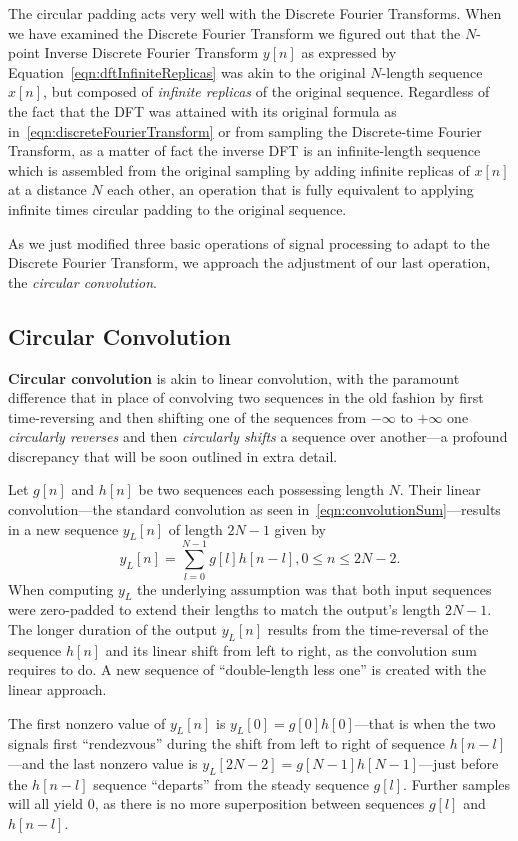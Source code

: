 \documentclass[\documentfontsize, twocolumn]{\classname}
\begin{document}
The circular padding acts very well with the Discrete Fourier Transforms. When we have examined the Discrete Fourier Transform we figured out that the $N$-point Inverse Discrete Fourier Transform $y[n]$ as expressed by Equation~\ref{eqn:dftInfiniteReplicas} was akin to the original $N$-length sequence $x[n]$, but composed of \emph{infinite replicas} of the original sequence. Regardless of the fact that the DFT was attained with its original formula as in~\ref{eqn:discreteFourierTransform} or from sampling the Discrete-time Fourier Transform, as a matter of fact the inverse DFT is an infinite-length sequence which is assembled from the original sampling by adding infinite replicas of $x[n]$ at a distance $N$ each other, an operation that is fully equivalent to applying infinite times circular padding to the original sequence.

As we just modified three basic operations of signal processing to adapt to the Discrete Fourier Transform, we approach the adjustment of our last operation, the \emph{circular convolution}.

\subsection{Circular Convolution}

\textbf{Circular convolution} is akin to linear convolution, with the paramount difference that in place of convolving two sequences in the old fashion by first time-reversing and then shifting one of the sequences from $-\infty$ to $+\infty$ one \emph{circularly reverses} and then \emph{circularly shifts} a sequence over another---a profound discrepancy that will be soon outlined in extra detail.

Let $g[n]$ and $h[n]$ be two sequences each possessing length $N$. Their linear convolution---the standard convolution as seen in~\ref{eqn:convolutionSum}---results in a new sequence $y_L[n]$ of length $2N-1$ given by
\[
    y_L[n] = \sum_{l=0}^{N-1} g[l] h[n-l], 0 \leq n \leq 2N-2.
\]
When computing $y_L$ the underlying assumption was that both input sequences were zero-padded to extend their lengths to match the output's length $2N-1$. The longer duration of the output $y_L[n]$ results from the time-reversal of the sequence $h[n]$ and its linear shift from left to right, as the convolution sum requires to do. A new sequence of ``double-length less one'' is created with the linear approach.

The first nonzero value of $y_L[n]$ is $y_L[0] = g[0]h[0]$---that is when the two signals first ``rendezvous'' during the shift from left to right of sequence $h[n-l]$---and the last nonzero value is $y_L[2N-2] = g[N-1]h[N-1]$---just before the $h[n-l]$ sequence ``departs'' from the steady sequence $g[l]$. Further samples will all yield $0$, as there is no more superposition between sequences $g[l]$ and $h[n-l]$.
\end{document}
